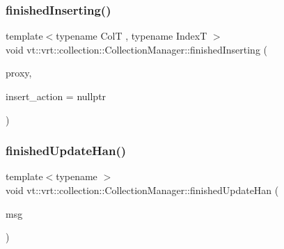 \mbox{\label{structvt_1_1vrt_1_1collection_1_1_collection_manager_a54edc9079585574858ecf512761f8efc}} 
\subsubsection{\texorpdfstring{finished\+Inserting()}{finishedInserting()}}
{\footnotesize\ttfamily template$<$typename ColT , typename IndexT $>$ \\
void vt\+::vrt\+::collection\+::\+Collection\+Manager\+::finished\+Inserting (\begin{DoxyParamCaption}\item[{\hyperlink{structvt_1_1vrt_1_1collection_1_1_collection_manager_a56458ed7f9bb22b631b9b3a745f42f94}{Collection\+Proxy\+Wrap\+Type}$<$ ColT, IndexT $>$ const \&}]{proxy,  }\item[{\hyperlink{namespacevt_ae0a5a7b18cc99d7b732cb4d44f46b0f3}{Action\+Type}}]{insert\+\_\+action = {\ttfamily nullptr} }\end{DoxyParamCaption})}

\mbox{\label{structvt_1_1vrt_1_1collection_1_1_collection_manager_a1e3aca203f1197782ec543da1d16b115}} 
\subsubsection{\texorpdfstring{finished\+Update\+Han()}{finishedUpdateHan()}}
{\footnotesize\ttfamily template$<$typename $>$ \\
void vt\+::vrt\+::collection\+::\+Collection\+Manager\+::finished\+Update\+Han (\begin{DoxyParamCaption}\item[{\hyperlink{structvt_1_1vrt_1_1collection_1_1_finished_update_msg}{Finished\+Update\+Msg} $\ast$}]{msg }\end{DoxyParamCaption})\hspace{0.3cm}{\ttfamily [static]}}

